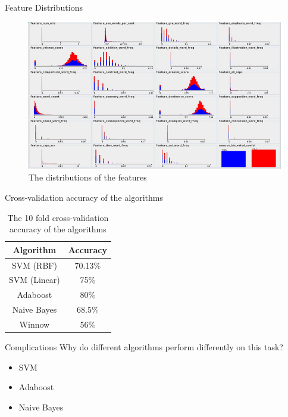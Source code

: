 \documentclass{beamer}
\begin{document}
\begin{frame}{Feature Distributions}
\begin{figure}[h]
  \centering
  \includegraphics[scale=.4]{features_distributions}
  \caption{The distributions of the features}
  \label{fig:dist}
\end{figure}
\end{frame}

\begin{frame}{Cross-validation accuracy of the algorithms}
\begin{table}[ht]
  \centering
  \begin{tabular}{c | c}
    Algorithm    & Accuracy \\
    \hline
    SVM (RBF)    & 70.13\%  \\
    SVM (Linear) & 75\%     \\
    Adaboost     & 80\%     \\
    Naive Bayes  & 68.5\%   \\
    Winnow       & 56\%     \\
  \end{tabular}
  \caption{The 10 fold cross-validation accuracy of the algorithms}
  \label{tab:performance}
\end{table}
\end{frame}

\begin{frame}{Complications}
Why do different algorithms perform differently on this task?
\begin{itemize}
\item SVM
\item Adaboost
\item Naive Bayes 
\end{itemize}
\end{frame}
\end{document}
